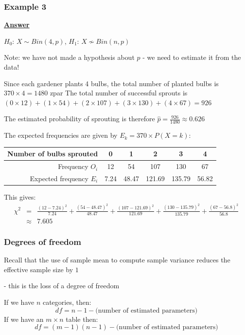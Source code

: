 \documentclass[t,8pt]{beamer}%
\begin{document}
\begin{frame}
	\frametitle{Example 3}
    {\bf\underline{Answer}} \par
    $H_0$: $X\sim Bin(4,p)$, $H_1$: $X\nsim Bin(n,p)$ \par
    Note: we have not made a hypothesis about $p$ - we need to estimate it from the data! \par
    Since each gardener plants 4 bulbs, the total number of planted bulbs is $370 \times 4 = 1480$ zpar
    The total number of successful sprouts is $(0 \times 12) + (1 \times 54) + (2 \times 107) + (3 \times 130) + (4 \times 67) = 926$ \par
    The estimated probability of sprouting is therefore $\hat p=\frac{926}{1480} \approx 0.626$ \par
    The expected frequencies are given by $E_k = 370 \times P(X = k)$:
    \begin{center}
        \begin{tabular}{r|ccccc}
            Number of bulbs sprouted & 0 & 1 & 2 & 3 & 4 \\ \hline
            Frequency $O_i$ & 12 & 54 & 107 & 130 & 67 \\
            Expected frequency $E_i$ & 7.24 & 48.47 & 121.69 & 135.79 & 56.82 \\
        \end{tabular}
    \end{center}
    This gives:
    \begin{eqnarray*}
        \chi^2 &=& \frac{(12 - 7.24)^2}{7.24} + \frac{(54 - 48.47)^2}{48.47} + \frac{(107 - 121.69)^2}{121.69} + \frac{(130 - 135.79)^2}{135.79} + \frac{(67 - 56.8)^2}{56.8}\\
        &\approx& 7.605
    \end{eqnarray*}
\end{frame}

\begin{frame}
    \frametitle{Degrees of freedom}
    Recall that the use of sample mean to compute sample variance reduces the effective sample size by $1$ \par- this is the loss of a degree of freedom \par
    If we have $n$ categories, then:
    \[
    df = n - 1 - \text{(number of estimated parameters)}
    \]
    If we have an $m\times n$ table then:
    \[
    df = (m-1)(n-1) - \text{(number of estimated parameters)}
    \]
\end{frame}
\end{document}
